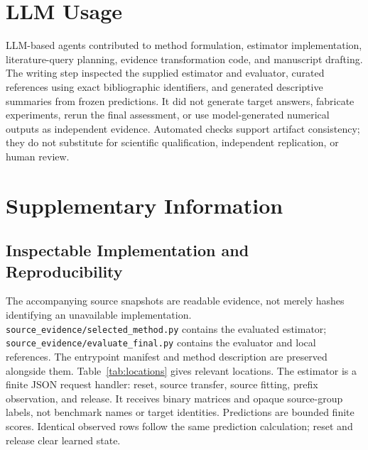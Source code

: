 \documentclass{article}
\begin{document}
\clearpage



\section*{LLM Usage}
LLM-based agents contributed to method formulation, estimator implementation, literature-query planning, evidence transformation code, and manuscript drafting. The writing step inspected the supplied estimator and evaluator, curated references using exact bibliographic identifiers, and generated descriptive summaries from frozen predictions. It did not generate target answers, fabricate experiments, rerun the final assessment, or use model-generated numerical outputs as independent evidence. Automated checks support artifact consistency; they do not substitute for scientific qualification, independent replication, or human review.

\clearpage
\appendix
\section{Supplementary Information}
\subsection{Inspectable Implementation and Reproducibility}
The accompanying source snapshots are readable evidence, not merely hashes identifying an unavailable implementation. \texttt{source\_evidence/selected\_method.py} contains the evaluated estimator; \texttt{source\_evidence/evaluate\_final.py} contains the evaluator and local references. The entrypoint manifest and method description are preserved alongside them. Table~\ref{tab:locations} gives relevant locations. The estimator is a finite JSON request handler: reset, source transfer, source fitting, prefix observation, and release. It receives binary matrices and opaque source-group labels, not benchmark names or target identities. Predictions are bounded finite scores. Identical observed rows follow the same prediction calculation; reset and release clear learned state.
\end{document}
